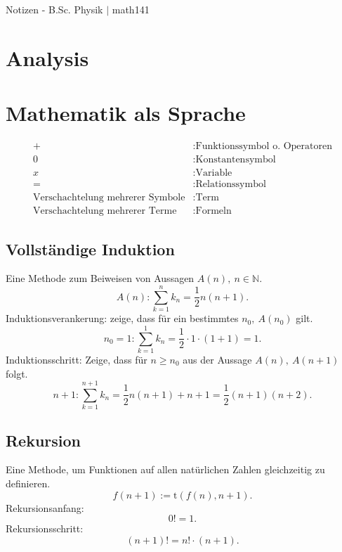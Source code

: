 \documentclass[a4paper,12pt]{article}
\begin{document}
\thispagestyle{empty}
\hfill
\Huge
\begin{center}
        Notizen - B.Sc. Physik $|$ math141
\end{center}
\normalsize
\hfill


\newpage

\tableofcontents


\newpage


\section*{Analysis}


\section{Mathematik als Sprache}
\begin{align*}
        +&:\text{Funktionssymbol o. Operatoren}\\
        0&:\text{Konstantensymbol}\\
        x&:\text{Variable}\\
        =&:\text{Relationssymbol}\\
        \text{Verschachtelung mehrerer Symbole}&:\text{Term}\\
        \text{Verschachtelung mehrerer Terme}&:\text{Formeln}
\end{align*}

\subsection{Vollständige Induktion}
Eine Methode zum Beiweisen von Aussagen $A\left( n\right) ,\ n  \in \mathbb{N}$.
\[ 
A\left( n\right) :\sum_{k=1}^{n}k_n=\dfrac{1}{2}n\left( n+1\right) 
.\] 
Induktionsverankerung: zeige, dass für ein bestimmtes $n_0,\ A\left( n_0\right) $ gilt.
\[ 
n_0=1:\sum_{k=1}^{1}k_n=\dfrac{1}{2}\cdot 1\cdot \left( 1+1\right) =1
.\] 
Induktionsschritt: Zeige, dass für $n\geq n_0$ aus der Aussage $A\left( n\right),\ A\left( n+1\right) $ folgt.
\[ 
n+1:\sum_{k=1}^{n+1}k_n=\dfrac{1}{2}n\left( n+1\right) +n+1=\dfrac{1}{2}\left( n+1\right) \left( n+2\right) 
.\] 

\subsection{Rekursion}
Eine Methode, um Funktionen auf allen natürlichen Zahlen gleichzeitig zu definieren.
\[ 
f\left( n+1\right) :=\text{t}\left( f\left( n\right) ,n+1\right) 
.\] Rekursionsanfang:
\[ 
0!=1
.\] 
Rekursionsschritt:
\[ 
        \left( n+1\right) !=n!\cdot \left( n+1\right) 
.\] 
\end{document}
